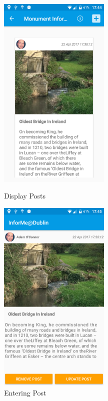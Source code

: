 \begin{figure}[!tbp]
	\centering
	\begin{minipage}[b]{0.4\textwidth}
		\includegraphics[width=150pt]{Display-Posts}
		\caption{Display Posts}
		\label{Figure: Display Posts}
	\end{minipage}
	\hfill
	\begin{minipage}[b]{0.4\textwidth}
		\includegraphics[width=150pt]{onClickPost}
		\caption{Entering Post} 
		\label{Figure: Entering Post}
	\end{minipage}
\end{figure}
